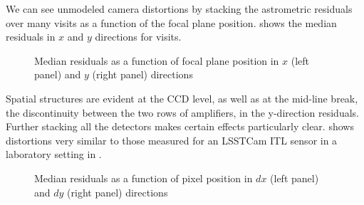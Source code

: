 We can see unmodeled camera distortions by stacking the astrometric residuals over many visits as a function of the focal plane position.
 shows the median residuals in $x$ and $y$ directions for \nvisits visits.
\begin{figure}[htb!]
\caption{Median residuals as a function of focal plane position in $x$ (left panel) and $y$ (right panel) directions}
\label{fig:Astrometry_FoV}
\end{figure}
Spatial structures are evident at the \gls{CCD} level, as well as at the mid-line break,  the discontinuity between the two rows of amplifiers,  in the y-direction residuals.
Further stacking all the detectors makes certain effects particularly clear.
 shows distortions very similar to those measured for an \gls{LSSTCam} \gls{ITL} sensor in a laboratory setting in \citet{2023PASP..135k5003E}.
\begin{figure}[htb!]
\caption{Median residuals as a function of pixel position in $dx$ (left panel) and $dy$ (right panel) directions}
\label{fig:Astrometry_CCD}
\end{figure}


